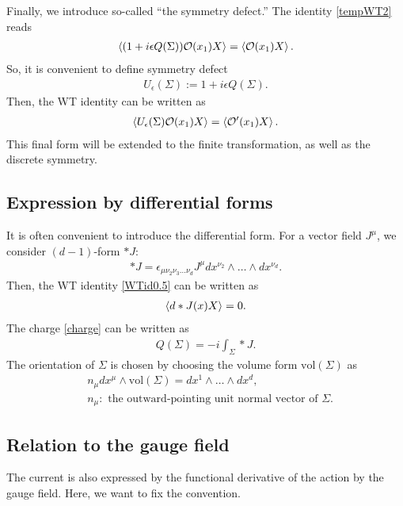 \documentclass[12pt]{scrartcl}
\newcommand{\Ocal}{\mathcal{O}}
\begin{document}
Finally, we introduce so-called ``the symmetry defect.''  The identity \eqref{tempWT2} reads
\begin{align}
    \expval{(1+i\epsilon Q(\Sigma))\Ocal(x_1)X}=\expval{\Ocal(x_1)X}.
\end{align}
So, it is convenient to define symmetry defect
\begin{align}
    U_{\epsilon}(\Sigma):=
    1+i\epsilon Q(\Sigma).
\end{align}
Then, the WT identity can be written as
\begin{align}
    \expval{U_{\epsilon}(\Sigma)\Ocal(x_1) X}=\expval{\Ocal'(x_1)X}.
\end{align}
This final form will be extended to the finite transformation, as well as the discrete symmetry.
\subsection{Expression by differential forms}

It is often convenient to introduce the differential form.  For a vector field $J^{\mu}$, we consider $(d-1)$-form $*J$:
\begin{align}
    *J=\epsilon_{\mu\nu_2\nu_3\dots \nu_d}J^{\mu}dx^{\nu_2}\wedge \dots \wedge dx^{\nu_d}.
\end{align}
Then, the WT identity \eqref{WTid0.5} can be written as
\begin{align}
    \expval{d*J(x) X}=0.
\end{align}
The charge \eqref{charge} can be written as
\begin{align}
    Q(\Sigma)=-i\int_{\Sigma}*J.
\end{align}
The orientation of $\Sigma$ is chosen by choosing the volume form $\mathrm{vol}(\Sigma)$ as
\begin{align}
    &n_{\mu}dx^{\mu}\wedge \mathrm{vol}(\Sigma)=dx^{1}\wedge \dots \wedge dx^{d},\\
    &n_{\mu}:\text{ the outward-pointing unit normal vector of } \Sigma.\nonumber
\end{align}


\subsection{Relation to the gauge field}

The current is also expressed by the functional derivative of the action by the gauge field.  Here, we want to fix the convention.
\end{document}
